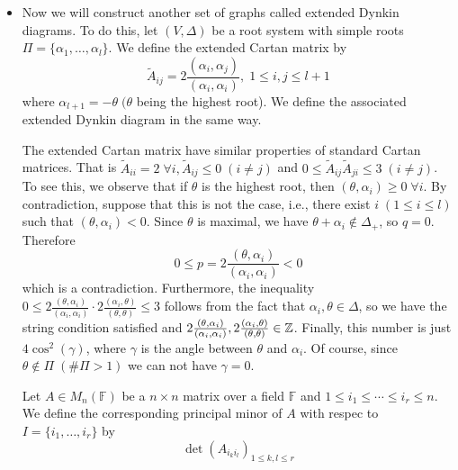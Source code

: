 \begin{itemize}
\item Now we will construct another set of graphs called extended Dynkin diagrams. To do this, let $(V,\Delta)$ be a root 
system with simple roots $\Pi=\{\alpha_1,\dots,\alpha_l\}$. We define the extended Cartan matrix by 
\begin{equation}
    \widetilde{A}_{ij}=2\frac{(\alpha_i,\alpha_j)}{(\alpha_i,\alpha_i)},\;1\leq i,j\leq l+1
\end{equation}
where $\alpha_{l+1}=-\theta\;(\theta$ being the highest root). 
We define the associated extended Dynkin diagram in the same way. \par 
The extended Cartan matrix have similar properties of standard Cartan matrices. That is 
$\widetilde{A}_{ii}=2\;\forall i,  \widetilde{A}_{ij}\leq 0\;(i\neq j)$ 
and $0\leq  \widetilde{A}_{ij} \widetilde{A}_{ji}\leq 3\;(i\neq j)$. To see this, we observe that 
if $\theta$ is the highest root, then $(\theta,\alpha_i)\geq0\;\forall i$. By contradiction, suppose that this is not 
the case, i.e., there exist $i\;(1\leq i\leq l)$ such that $(\theta,\alpha_i)<0$. Since $\theta$ is maximal, we have 
$\theta+\alpha_i\notin\Delta_+$, so $q=0$. Therefore 
\begin{equation}
    0\leq p=2\frac{(\theta,\alpha_i)}{(\alpha_i,\alpha_i)}<0
\end{equation}
which is a contradiction. Furthermore, the inequality 
$0\leq 2\tfrac{(\theta,\alpha_i)}{(\alpha_i,\alpha_i)}\cdot2\tfrac{(\alpha_i,\theta)}{(\theta,\theta)}\leq 3$ follows from the fact 
that $\alpha_i,\theta\in\Delta$, so we have the string condition satisfied and 
$2\tfrac{(\theta,\alpha_i)}{(\alpha_i,\alpha_i)},2\tfrac{(\alpha_i,\theta)}{(\theta,\theta)}\in\mathbb{Z}$. Finally, this number is just 
$4\cos^2(\gamma)$, where $\gamma$ is the angle between $\theta$ and $\alpha_i$. Of course, since $\theta\notin\Pi\;(\#\Pi>1)$ we can not 
have $\gamma=0$.

\begin{dang}
    \begin{remark}
        Let $A\in M_n(\mathbb{F})$ be a $n\times n$ matrix over a field $\mathbb{F}$ and 
        $1\leq i_1\leq\cdots\leq i_r\leq n$. We define the corresponding principal minor of $A$ with respec to 
        $I=\{i_1,\dots, i_r\}$ by 
        \begin{equation}
            \det(A_{i_ki_l})_{1\leq k,l\leq r}
        \end{equation}
    \end{remark}
\end{dang}


\end{itemize}
